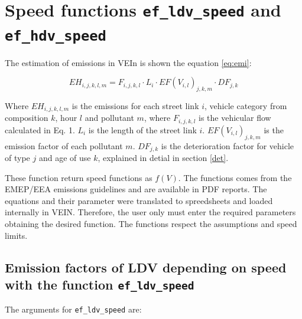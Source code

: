 \documentclass[12pt,graybox,envcountchap,sectrefs]{krantz}
\theoremstyle{definition}
\theoremstyle{definition}
\theoremstyle{definition}
\theoremstyle{remark}
\begin{document}
\section{\texorpdfstring{Speed functions \texttt{ef\_ldv\_speed} and
\texttt{ef\_hdv\_speed}}{Speed functions ef\_ldv\_speed and ef\_hdv\_speed}}\label{speedef}

The estimation of emissions in VEIn is shown the equation \eqref{eq:emi}:

\begin{equation}
EH_{i,j,k,l,m} =F_{i,j,k,l} \cdot L_i \cdot EF(V_{i,l})_{j,k,m} \cdot DF_{j,k}
\label{eq:emi}
\end{equation}

Where \(EH_{i,j,k,l,m}\) is the emissions for each street link \(i\),
vehicle category from composition \(k\), hour \(l\) and pollutant \(m\),
where \(F_{i,j,k,l}\) is the vehicular flow calculated in Eq. 1. \(L_i\)
is the length of the street link \(i\). \(EF(V_{i,l})_{j,k,m}\) is the
emission factor of each pollutant \(m\). \(DF_{j,k}\) is the
deterioration factor for vehicle of type \(j\) and age of use \(k\),
explained in detial in section \ref{det}.

These function return speed functions as \(f(V)\). The functions comes
from the EMEP/EEA emissions guidelines \citep{NtziachristosSamaras2016}
and are available in PDF reports. The equations and their parameter were
translated to spreedsheets and loaded internally in VEIN. Therefore, the
user only must enter the required parameters obtaining the desired
function. The functions respect the assumptions and speed limits.

\subsection{\texorpdfstring{Emission factors of LDV depending on speed
with the function
\texttt{ef\_ldv\_speed}}{Emission factors of LDV depending on speed with the function ef\_ldv\_speed}}\label{emission-factors-of-ldv-depending-on-speed-with-the-function-ef_ldv_speed}

The arguments for \texttt{ef\_ldv\_speed} are:
\end{document}
